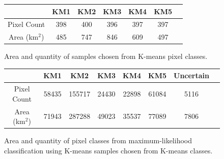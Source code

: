 \documentclass[12pt]{article}
\begin{document}
\begin{figure}[h!]
    \centering
    \begin{tabular}{c|cccccc}
    & KM1 & KM2 & KM3 & KM4 & KM5 \\
    \hline
    Pixel Count & 398 & 400 & 396 & 397 & 397\\
    Area (km$^2$) & 485 & 747 & 846 & 609 & 497\\
    \end{tabular}
    \caption{Area and quantity of samples chosen from K-means pixel classes.}
    \label{sample_km_areas}
\end{figure}

\begin{figure}[h!]
    \centering
    \begin{tabular}{c|ccccccc}
    & KM1 & KM2 & KM3 & KM4 & KM5 & Uncertain\\
    \hline
    Pixel Count & 58435 & 155717 & 24430 & 22898 & 61084 & 5116\\
    Area (km$^2$) & 71943 & 287288 & 49023 & 35537 & 77089 & 7806\\
    \end{tabular}
    \caption{Area and quantity of pixel classes from maximum-likelihood classification using K-means samples chosen from K-means classes.}
    \label{mlc_km_areas}
\end{figure}


\clearpage
\end{document}
